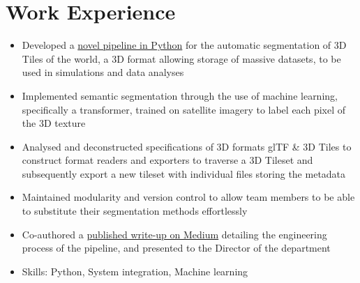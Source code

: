 \documentclass{cv}
\begin{document}
\section{Work Experience}
\begin{subsections}

    \subtitle{Simulation \& Training Systems Hub, Defence Science and Technology Agency}
    \begin{itemize}
        \item Developed a \href{https://github.com/thedylone/tile-segmentation-pipeline}{novel pipeline in Python} for the automatic segmentation of 3D Tiles of the world, a 3D format allowing storage of massive datasets, to be used in simulations and data analyses
        \item Implemented semantic segmentation through the use of machine learning, specifically a transformer, trained on satellite imagery to label each pixel of the 3D texture
        \item Analysed and deconstructed specifications of 3D formats glTF \& 3D Tiles to construct format readers and exporters to traverse a 3D Tileset and subsequently export a new tileset with individual files storing the metadata
        \item Maintained modularity and version control to allow team members to be able to substitute their segmentation methods effortlessly
        \item Co-authored a \href{https://medium.com/d-classified/segmentation-pipeline-for-3d-tiles-1303fcb5e6be}{published write-up on Medium} detailing the engineering process of the pipeline, and presented to the Director of the department
        \item Skills: Python, System integration, Machine learning
    \end{itemize}


\end{subsections}
\end{document}
